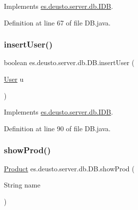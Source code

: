 Implements \hyperlink{interfacees_1_1deusto_1_1server_1_1db_1_1_i_d_b_a4c9c0a9511fde5b541a49de8f8399d28}{es.\+deusto.\+server.\+db.\+I\+DB}.



Definition at line 67 of file D\+B.\+java.

\mbox{\label{classes_1_1deusto_1_1server_1_1db_1_1_d_b_a1070e289debd4f0fb5519c245c4e7ed7}} 
\subsubsection{\texorpdfstring{insert\+User()}{insertUser()}}
{\footnotesize\ttfamily boolean es.\+deusto.\+server.\+db.\+D\+B.\+insert\+User (\begin{DoxyParamCaption}\item[{\hyperlink{classes_1_1deusto_1_1server_1_1db_1_1data_1_1_user}{User}}]{u }\end{DoxyParamCaption})}



Implements \hyperlink{interfacees_1_1deusto_1_1server_1_1db_1_1_i_d_b_a9d76b65686526214b48cd7d8f8dcdc86}{es.\+deusto.\+server.\+db.\+I\+DB}.



Definition at line 90 of file D\+B.\+java.

\mbox{\label{classes_1_1deusto_1_1server_1_1db_1_1_d_b_a1c170a7c91ca5223560b4490738ccf56}} 
\subsubsection{\texorpdfstring{show\+Prod()}{showProd()}}
{\footnotesize\ttfamily \hyperlink{classes_1_1deusto_1_1server_1_1db_1_1data_1_1_product}{Product} es.\+deusto.\+server.\+db.\+D\+B.\+show\+Prod (\begin{DoxyParamCaption}\item[{String}]{name }\end{DoxyParamCaption})}



